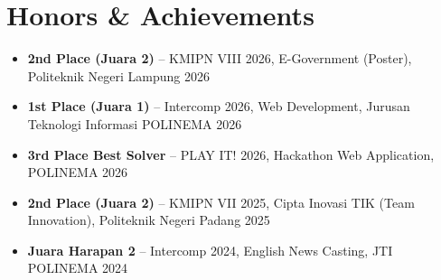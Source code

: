 \section{Honors \& Achievements}

\begin{itemize}
  \item \textbf{2nd Place (Juara 2)} -- KMIPN VIII 2026, E-Government (Poster), Politeknik Negeri Lampung \hfill {\small 2026}
  \item \textbf{1st Place (Juara 1)} -- Intercomp 2026, Web Development, Jurusan Teknologi Informasi POLINEMA \hfill {\small 2026}
  \item \textbf{3rd Place Best Solver} -- PLAY IT! 2026, Hackathon Web Application, POLINEMA \hfill {\small 2026}
  \item \textbf{2nd Place (Juara 2)} -- KMIPN VII 2025, Cipta Inovasi TIK (Team Innovation), Politeknik Negeri Padang \hfill {\small 2025}
  \item \textbf{Juara Harapan 2} -- Intercomp 2024, English News Casting, JTI POLINEMA \hfill {\small 2024}
\end{itemize}
